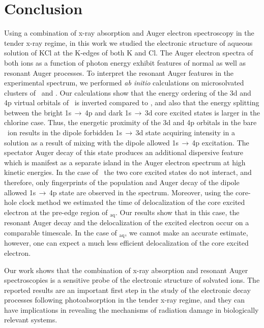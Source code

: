 \section{Conclusion}\label{sec:concl}

Using a combination of x-ray absorption and Auger electron spectroscopy in the tender x-ray regime, in this work we studied the electronic structure of aqueous solution of KCl at the K-edges of both K and Cl. The Auger electron spectra of both ions as a function of photon energy exhibit features of normal as well as resonant Auger processes. To interpret the resonant Auger features in the experimental spectrum, we performed {\it ab initio} calculations on microsolvated clusters of \ki~and \cli. Our calculations show that the energy ordering of the 3d and 4p virtual orbitals of \cli~is inverted compared to \ki, and also that the energy splitting between the bright 1s$\,\rightarrow\,$4p and dark 1s$\,\rightarrow\,$3d core excited states is larger in the chlorine case. Thus, the energetic proximity of the 3d and 4p orbitals in the bare \ki~ion results in the dipole forbidden 1s$\,\rightarrow\,$3d state acquiring intensity in a solution as a result of mixing with the dipole allowed 1s$\,\rightarrow\,$4p excitation. The spectator Auger decay of this state produces an additional dispersive feature which is manifest as a separate island in the Auger electron spectrum at high kinetic energies. In the case of \cli~the two core excited states do not interact, and therefore, only fingerprints of the population and Auger decay of the dipole allowed 1s$\,\rightarrow\,$4p state are observed in the spectrum. Moreover, using the core-hole clock method we estimated the time of delocalization of the core excited electron at the pre-edge region of \cli$_{\text{aq}}$. Our results show that in this case, the resonant Auger decay and the delocalization of the excited electron occur on a comparable timescale. In the case of \ki$_{\text{aq}}$, we cannot make an accurate estimate, however, one can expect a much less efficient delocalization of the core excited electron.


Our work shows that the combination of x-ray absorption and resonant Auger spectroscopies is a sensitive probe of the electronic structure of solvated ions. The reported results are an important first step in the study of the electronic decay processes following photoabsorption in the tender x-ray regime, and they can have implications in revealing the mechanisms of radiation damage in biologically relevant systems.